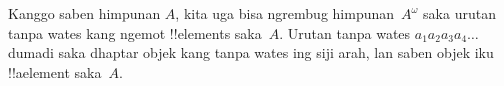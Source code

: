 \documentclass[../../../include/open-logic-section]{subfiles}
\begin{document}
\begin{ex}
Kanggo saben himpunan $A$, kita uga bisa ngrembug himpunan~$A^\omega$
saka urutan tanpa wates kang ngemot !!{element}s saka~$A$.
Urutan tanpa wates $a_1a_2a_3a_4\dots$ dumadi saka dhaptar
objek kang tanpa wates ing siji arah, lan saben objek iku
!!a{element} saka~$A$.
\end{ex}
\end{document}
